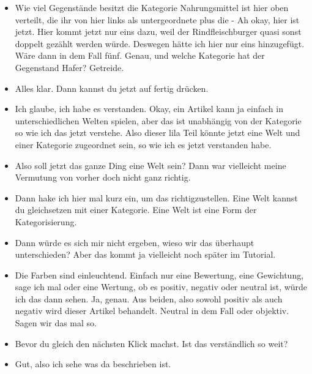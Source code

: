 {\begin{itemize}[]
                  Deswegen würde ich da jetzt eine vier einfügen.
            \item {} Wie viel Gegenstände besitzt die Kategorie Nahrungsmittel ist hier oben verteilt, die ihr von hier links als untergeordnete plus die - Ah okay, hier ist jetzt.
                  Hier kommt jetzt nur eins dazu, weil der Rindfleischburger quasi sonst doppelt gezählt werden würde.
                  Deswegen hätte ich hier nur eins hinzugefügt.
                  Wäre dann in dem Fall fünf.
                  Genau, und welche Kategorie hat der Gegenstand Hafer?
                  Getreide.
            \item {} Alles klar.
                  Dann kannst du jetzt auf fertig drücken.
            \item {} Ich glaube, ich habe es verstanden.
                  Okay, ein Artikel kann ja einfach in unterschiedlichen Welten spielen, aber das ist unabhängig von der Kategorie so wie ich das jetzt verstehe.
                  Also dieser lila Teil könnte jetzt eine Welt und einer Kategorie zugeordnet sein, so wie ich es jetzt verstanden habe.
            \item {} Also soll jetzt das ganze Ding eine Welt sein?
                  Dann war vielleicht meine Vermutung von vorher doch nicht ganz richtig.
            \item {} Dann hake ich hier mal kurz ein, um das richtigzustellen.
                  Eine Welt kannst du gleichsetzen mit einer Kategorie.
                  Eine Welt ist eine Form der Kategorisierung.
            \item {} Dann würde es sich mir nicht ergeben, wieso wir das überhaupt unterschieden?
                  Aber das kommt ja vielleicht noch später im Tutorial.
            \item {} Die Farben sind einleuchtend.
                  Einfach nur eine Bewertung, eine Gewichtung, sage ich mal oder eine Wertung, ob es positiv, negativ oder neutral ist, würde ich das dann sehen.
                  Ja, genau.
                  Aus beiden, also sowohl positiv als auch negativ wird dieser Artikel behandelt.
                  Neutral in dem Fall oder objektiv.
                  Sagen wir das mal so.
            \item {} Bevor du gleich den nächsten Klick machst.
                  Ist das verständlich so weit?
            \item {} Gut, also ich sehe was da beschrieben ist.

\end{itemize}}
